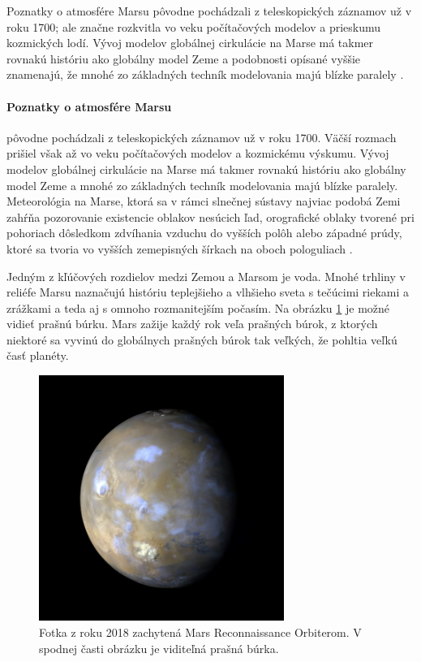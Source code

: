 Poznatky o atmosfére Marsu pôvodne pochádzali z teleskopických záznamov už v roku 1700; ale značne rozkvitla vo veku počítačových modelov a prieskumu kozmických lodí. Vývoj modelov globálnej cirkulácie na Marse má takmer rovnakú históriu ako globálny model Zeme a podobnosti opísané vyššie znamenajú, že mnohé zo základných techník modelovania majú blízke paralely \cite{meteo}.


\paragraph{Poznatky o atmosfére Marsu} pôvodne pochádzali z teleskopických záznamov už v roku 1700. Väčší rozmach prišiel však až vo veku počítačových modelov a kozmickému výskumu. Vývoj modelov globálnej cirkulácie na Marse má takmer rovnakú históriu ako globálny model Zeme a mnohé zo základných techník modelovania majú blízke paralely. Meteorológia na Marse, ktorá sa v rámci slnečnej sústavy najviac podobá Zemi zahŕňa pozorovanie existencie oblakov nesúcich ľad, orografické oblaky tvorené pri pohoriach dôsledkom zdvíhania vzduchu do vyšších polôh alebo západné prúdy, ktoré sa tvoria vo vyšších zemepisných šírkach na oboch pologuliach \cite{meteo}.

Jedným z kľúčových rozdielov medzi Zemou a Marsom je voda. Mnohé trhliny v reliéfe Marsu naznačujú históriu teplejšieho a vlhšieho sveta s tečúcimi riekami a zrážkami a teda aj s omnoho rozmanitejším počasím. Na obrázku \ref{duststorm} je možné vidieť prašnú búrku. Mars zažije každý rok veľa prašných búrok, z ktorých niektoré sa vyvinú do globálnych prašných búrok tak veľkých, že pohltia veľkú časť planéty.

\begin{figure}[!htbp]
  \centering
  \includegraphics[width=8cm]{img/dust_storm_MARS.jpg}
  \caption{Fotka z roku 2018 zachytená Mars Reconnaissance Orbiterom. V spodnej časti obrázku je viditeľná prašná búrka.}
  \label{duststorm}
\end{figure}

